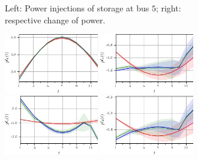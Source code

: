 \documentclass[final,3p,times,twocolumn]{elsarticle}  %
\begin{document}
\begin{figure}
\begin{subfigure}[c]{\figwidth}
		\vspace{-2mm}
		\caption{Left: Power injections of storage at bus $5$; right: respective change of power.}
		\label{fig:case5:Storage}
	\end{subfigure}
	\begin{subfigure}[c]{\figwidth}
	\centering
        \includegraphics[width=0.45\textwidth]{figures/time series/case5_artificial/line_901.jpg}
        \includegraphics[width=0.45\textwidth]{figures/time series/case5_artificial/line_902.jpg}
        \includegraphics[width=0.45\textwidth]{figures/time series/case5_artificial/line_903.jpg}
        \includegraphics[width=0.45\textwidth]{figures/time series/case5_artificial/line_904.jpg}

\end{subfigure}
\end{figure}
\end{document}
